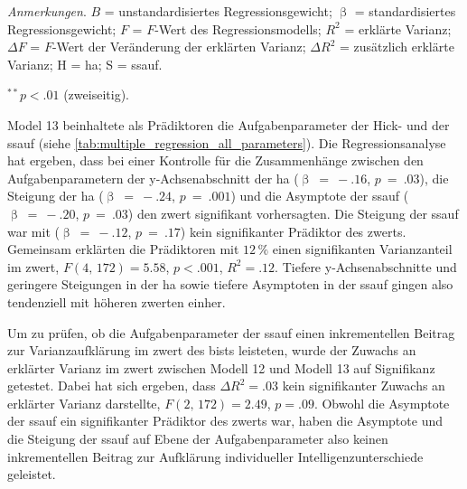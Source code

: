 \documentclass[11pt, twoside, a4paper]{book}		%
\begin{document}
\begin{table}[htbp]
\begin{adjustbox}{width=1\textwidth}
\begin{threeparttable}
		\begin{tablenotes}[flushleft]
			\footnotesize				%
			\setlength{}	%
			\item \textit{Anmerkungen}. $B$ = unstandardisiertes Regressionsgewicht; $\upbeta$ = standardisiertes Regressionsgewicht; $F$ = $F$-Wert des Regressionsmodells; $R^2$ = erklärte Varianz; $\Delta F$ = $F$-Wert der Veränderung der erklärten Varianz; $\Delta R^2$ = zusätzlich erklärte Varianz; H = \gls{ha}; S = \gls{ssauf}.
			\item {$^{**}$}$p<.01$ (zweiseitig).
		\end{tablenotes}
	\end{threeparttable}
	\end{adjustbox}
\end{table}

Model 13 beinhaltete als Prädiktoren die Aufgabenparameter der Hick- und der \gls{ssauf} (siehe \autoref{tab:multiple_regression_all_parameters}). 
Die Regressionsanalyse hat ergeben, dass bei einer Kontrolle für die Zusammenhänge zwischen den Aufgabenparametern der y-Achsenabschnitt der \gls{ha}  ($\upbeta~=~-.16$, $p~=~.03$), die Steigung der \gls{ha} ($\upbeta~=~-.24$, $p~=~.001$) und die Asymptote der \gls{ssauf} ($\upbeta~=~-.20$, $p~=~.03$) den \gls{zwert} signifikant vorhersagten. Die Steigung der \gls{ssauf} war mit ($\upbeta~=~-.12$, $p~=~.17$) kein signifikanter Prädiktor des \gls{zwert}s.
Gemeinsam erklärten die Prädiktoren mit $12\,\%$ einen signifikanten Varianzanteil im \gls{zwert}, $F(4,\,172)=5.58$, $p<.001$, $R^2=.12$. 
Tiefere y-Achsenabschnitte und geringere Steigungen in der \gls{ha} sowie tiefere Asymptoten in der \gls{ssauf} gingen also tendenziell mit höheren \gls{zwert}en einher.

Um zu prüfen, ob die Aufgabenparameter der \gls{ssauf} einen inkrementellen Beitrag zur Varianzaufklärung im \gls{zwert} des \gls{bist}s leisteten, wurde der Zuwachs an erklärter Varianz im \gls{zwert} zwischen Modell 12 und Modell 13 auf Signifikanz getestet. 
Dabei hat sich ergeben, dass $\Delta R^2=.03$ kein signifikanter Zuwachs an erklärter Varianz darstellte, $F(2,\,172)=2.49$, $p=.09$.
Obwohl die Asymptote der \gls{ssauf} ein signifikanter Prädiktor des \gls{zwert}s war, haben die Asymptote und die Steigung der \gls{ssauf} auf Ebene der Aufgabenparameter also keinen inkrementellen Beitrag zur Aufklärung individueller Intelligenzunterschiede geleistet.
\end{document}
